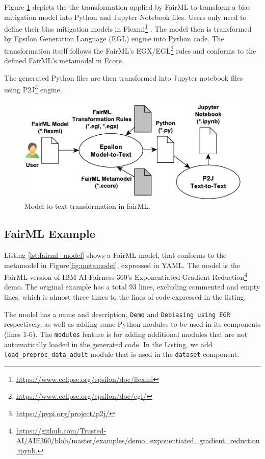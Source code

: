 \documentclass[sigconf,review]{acmart}
\begin{document}
Figure \ref{fig:transformation} depicts the the transformation applied by FairML to transform a bias mitigation model into Python and Jupyter Notebook files. Users only need to define their bias mitigation models in Flexmi\footnote{\url{https://www.eclipse.org/epsilon/doc/flexmi}} \cite{dimitris2016flexmi}. The model then is transformed by Epsilon Generation Language (EGL) \cite{rose2008egl} engine into Python code. The transformation itself follows the FairML's EGX/EGL\footnote{\url{https://www.eclipse.org/epsilon/doc/egl/}} rules and conforms to the defined FairML's metamodel in Ecore \cite{steinberg2009emf}.  

The generated Python files are then transformed into Jupyter notebook files using P2J\footnote{\url{https://pypi.org/project/p2j/}} engine.

\begin{figure}
	\includegraphics[width=\linewidth]{figures/transformation}
	\caption{Model-to-text transformation in fairML.}
	\label{fig:transformation}
\end{figure}



\subsection{FairML Example}
\label{sec:fairml_example}
Listing \ref{lst:fairml_model} shows a FairML model, that conforms to the metamodel in Figure\ref{fig:metamodel}, expressed in YAML. The model is the FairML version of 
IBM AI Fairness 360's Exponentiated Gradient Reduction\footnote{\url{https://github.com/Trusted-AI/AIF360/blob/master/examples/demo_exponentiated_gradient_reduction.ipynb.}} demo. The original example has a total 93 lines, excluding commented and empty lines, which is almost three times to the lines of code expressed in the listing.

The model has a name and description, \texttt{Demo} and \texttt{Debiasing using EGR} respectively, as well as adding some Python modules to be used in its components (lines 1-6). The \texttt{modules} feature is for adding additional modules that are not automatically loaded in the generated code. In the Listing, we add \texttt{load\_preproc\_data\_adult} module that is used in the \texttt{dataset} component.
\end{document}
